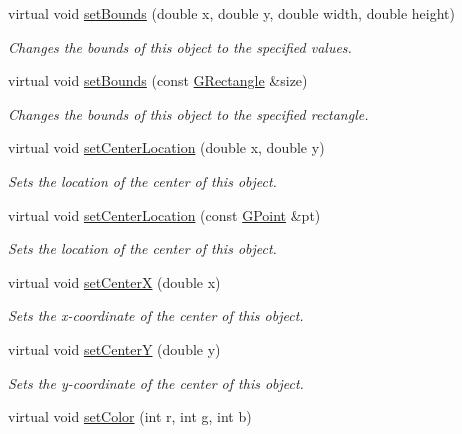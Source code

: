 \begin{DoxyCompactItemize}
virtual void \mbox{\hyperlink{classsgl_1_1GObject_a2aae8197624b72265ab83b4f1bc73f2f}{set\+Bounds}} (double x, double y, double width, double height)
\begin{DoxyCompactList}\small\item\em Changes the bounds of this object to the specified values. \end{DoxyCompactList}\item 
virtual void \mbox{\hyperlink{classsgl_1_1GObject_acada386653f008cacc7cce86426bef7c}{set\+Bounds}} (const \mbox{\hyperlink{structsgl_1_1GRectangle}{G\+Rectangle}} \&size)
\begin{DoxyCompactList}\small\item\em Changes the bounds of this object to the specified rectangle. \end{DoxyCompactList}\item 
virtual void \mbox{\hyperlink{classsgl_1_1GObject_a290b47dd8de1be44089f95cb2c47c1de}{set\+Center\+Location}} (double x, double y)
\begin{DoxyCompactList}\small\item\em Sets the location of the center of this object. \end{DoxyCompactList}\item 
virtual void \mbox{\hyperlink{classsgl_1_1GObject_a1bedf1b233ecba3f753ec58908a683a6}{set\+Center\+Location}} (const \mbox{\hyperlink{structsgl_1_1GPoint}{G\+Point}} \&pt)
\begin{DoxyCompactList}\small\item\em Sets the location of the center of this object. \end{DoxyCompactList}\item 
virtual void \mbox{\hyperlink{classsgl_1_1GObject_a2f4936281e056eead00a9186b9ba8af6}{set\+CenterX}} (double x)
\begin{DoxyCompactList}\small\item\em Sets the x-\/coordinate of the center of this object. \end{DoxyCompactList}\item 
virtual void \mbox{\hyperlink{classsgl_1_1GObject_aad2a22b4fde88c33306b92aebf641d57}{set\+CenterY}} (double y)
\begin{DoxyCompactList}\small\item\em Sets the y-\/coordinate of the center of this object. \end{DoxyCompactList}\item 
virtual void \mbox{\hyperlink{classsgl_1_1GObject_ad57ef49bc31db94e92648aa3737923d6}{set\+Color}} (int r, int g, int b)

\end{DoxyCompactItemize}
